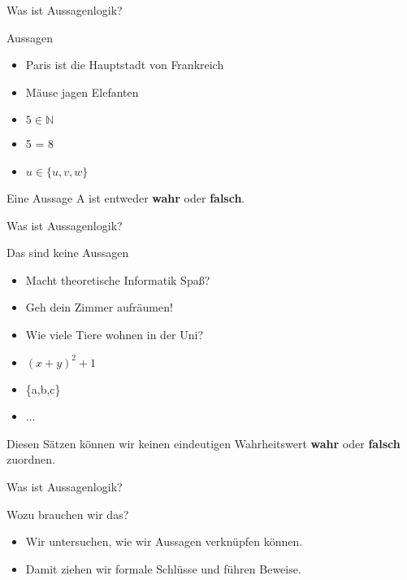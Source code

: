 \begin{frame}[fragile]{Was ist Aussagenlogik?}
    \begin{alertblock}{Aussagen}
    \begin{itemize}
        \item Paris ist die Hauptstadt von Frankreich
        \item Mäuse jagen Elefanten
        \item $5 \in \mathbb{N}$
        \item 5 = 8
        \item $u \in \{u, v, w\}$
    \end{itemize}
    \end{alertblock}
    Eine Aussage A ist entweder \textbf{wahr} oder \textbf{falsch}.
\end{frame}

\begin{frame}[fragile]{Was ist Aussagenlogik?}
    \begin{alertblock}{Das sind keine Aussagen}
    \begin{itemize}
        \item Macht theoretische Informatik Spaß?
        \item Geh dein Zimmer aufräumen!
        \item Wie viele Tiere wohnen in der Uni?
        \item $(x+y)^2+1$
        \item \{a,b,c\}
        \item ...
    \end{itemize}
    \end{alertblock}
    Diesen Sätzen können wir keinen eindeutigen Wahrheitswert \textbf{wahr} oder \textbf{falsch} zuordnen.
\end{frame}

\begin{frame}[fragile]{Was ist Aussagenlogik?}
    \begin{alertblock}{Wozu brauchen wir das?}
    \begin{itemize}
        \item Wir untersuchen, wie wir Aussagen verknüpfen können.
        \item Damit ziehen wir formale Schlüsse und führen Beweise.
    \end{itemize}
    \end{alertblock}
\end{frame}

